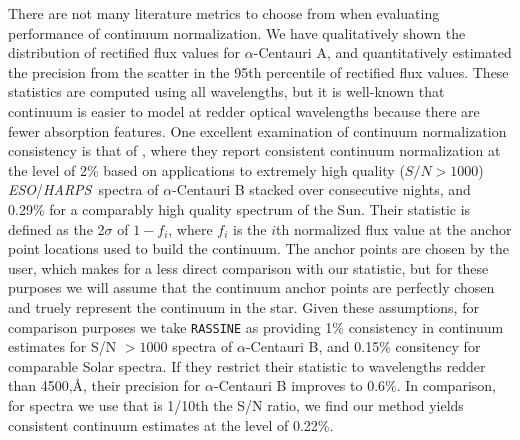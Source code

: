\documentclass[modern]{aastex631}
\newcommand{\project}[1]{\textit{#1}}
\newcommand{\eso}{\project{ESO}}
\newcommand{\harps}{\project{HARPS}}
\newcommand{\todo}[1]{\textcolor{tab:red}{#1}}
\begin{document}
There are not many literature metrics to choose from when evaluating performance of continuum normalization. We have qualitatively shown the distribution of rectified flux values for $\alpha$-Centauri A, and quantitatively estimated the precision from the scatter in the 95th percentile of rectified flux values. These statistics are computed using all wavelengths, but it is well-known that continuum is easier to model at redder optical wavelengths because there are fewer absorption features. One excellent examination of continuum normalization consistency is that of \citet{RASSINE}, where they report consistent continuum normalization at the level of 2\% based on applications to extremely high quality ($S/N > 1000$) \eso/\harps\ spectra of $\alpha$-Centauri B stacked over consecutive nights, and 0.29\% for a comparably high quality spectrum of the Sun. Their statistic is defined as the 2$\sigma$ of $1-f_i$, where $f_i$ is the $i$th normalized flux value at the anchor point locations used to build the continuum. The anchor points are chosen by the user, which makes for a less direct comparison with our statistic, but for these purposes we will assume that the continuum anchor points are perfectly chosen and truely represent the continuum in the star. Given these assumptions, for comparison purposes we take \texttt{RASSINE} as providing 1\% consistency in continuum estimates for S/N $> 1000$ spectra of $\alpha$-Centauri B, and 0.15\% consitency for comparable Solar spectra. If they restrict their statistic to wavelengths redder than 4500,\AA, their precision for $\alpha$-Centauri B improves to 0.6\%. In comparison, for spectra we use that is 1/10th the S/N ratio, we find our method yields consistent continuum estimates at the level of 0.22\%.\\

\end{document}
